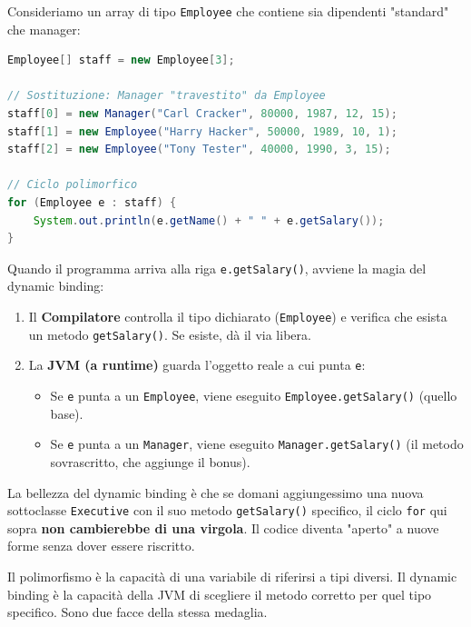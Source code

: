 Consideriamo un array di tipo \texttt{Employee} che contiene sia dipendenti "standard" che manager:

\begin{lstlisting}[language=Java, caption={Esempio di Dynamic Binding}]
Employee[] staff = new Employee[3];

// Sostituzione: Manager "travestito" da Employee
staff[0] = new Manager("Carl Cracker", 80000, 1987, 12, 15);
staff[1] = new Employee("Harry Hacker", 50000, 1989, 10, 1);
staff[2] = new Employee("Tony Tester", 40000, 1990, 3, 15);

// Ciclo polimorfico
for (Employee e : staff) {
    System.out.println(e.getName() + " " + e.getSalary());
}
\end{lstlisting}

Quando il programma arriva alla riga \texttt{e.getSalary()}, avviene la magia del dynamic binding:
\begin{enumerate}
    \item Il \textbf{Compilatore} controlla il tipo dichiarato (\texttt{Employee}) e verifica che esista un metodo \texttt{getSalary()}. Se esiste, dà il via libera.
    \item La \textbf{JVM (a runtime)} guarda l'oggetto reale a cui punta \texttt{e}:
    \begin{itemize}
        \item Se \texttt{e} punta a un \texttt{Employee}, viene eseguito \texttt{Employee.getSalary()} (quello base).
        \item Se \texttt{e} punta a un \texttt{Manager}, viene eseguito \texttt{Manager.getSalary()} (il metodo sovrascritto, che aggiunge il bonus).

    \end{itemize}
\end{enumerate}

\begin{observation}
    La bellezza del dynamic binding è che se domani aggiungessimo una nuova sottoclasse \texttt{Executive} con il suo metodo \texttt{getSalary()} specifico, il ciclo \texttt{for} qui sopra \textbf{non cambierebbe di una virgola}. Il codice diventa "aperto" a nuove forme senza dover essere riscritto.
\end{observation}

\begin{observation}
    Il polimorfismo è la capacità di una variabile di riferirsi a tipi diversi. Il dynamic binding è la capacità della JVM di scegliere il metodo corretto per quel tipo specifico. Sono due facce della stessa medaglia.
\end{observation}

